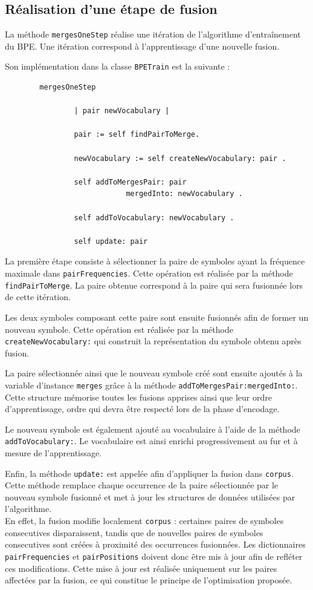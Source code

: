 \documentclass[12pt,a4paper]{report}
\begin{document}
	\subsection{Réalisation d’une étape de fusion}
	
	La méthode \texttt{mergesOneStep} réalise une itération de l’algorithme d’entraînement du BPE. Une itération correspond à l’apprentissage d’une nouvelle fusion.
	
	Son implémentation dans la classe \texttt{BPETrain} est la suivante :
	
	\begin{verbatim}
		mergesOneStep	
				
				| pair newVocabulary |
				
				pair := self findPairToMerge.	
				
				newVocabulary := self createNewVocabulary: pair .	
				
				self addToMergesPair: pair
							mergedInto: newVocabulary .	
				
				self addToVocabulary: newVocabulary .
				
				self update: pair
	\end{verbatim}
	
	La première étape consiste à sélectionner la paire de symboles ayant la fréquence maximale dans \texttt{pairFrequencies}. Cette opération est réalisée par la méthode \texttt{findPairToMerge}. La paire obtenue correspond à la paire qui sera fusionnée lors de cette itération.
	
	Les deux symboles composant cette paire sont ensuite fusionnés afin de former un nouveau symbole. Cette opération est réalisée par la méthode \texttt{createNewVocabulary:} qui construit la représentation du symbole obtenu après fusion.
	
	La paire sélectionnée ainsi que le nouveau symbole créé sont ensuite ajoutés à la variable d’instance \texttt{merges} grâce à la méthode \texttt{addToMergesPair:mergedInto:}. Cette structure mémorise toutes les fusions apprises ainsi que leur ordre d’apprentissage, ordre qui devra être respecté lors de la phase d’encodage.
	
	Le nouveau symbole est également ajouté au vocabulaire à l’aide de la méthode \texttt{addToVocabulary:}. Le vocabulaire est ainsi enrichi progressivement au fur et à mesure de l’apprentissage.
	
	Enfin, la méthode \texttt{update:} est appelée afin d’appliquer la fusion dans \texttt{corpus}. Cette méthode remplace chaque occurrence de la paire sélectionnée par le nouveau symbole fusionné et met à jour les structures de données utilisées par l’algorithme.\\
	En effet, la fusion modifie localement \texttt{corpus} : certaines paires de symboles consecutives disparaissent, tandis que de nouvelles paires de symboles consecutives sont créées à proximité des occurrences fusionnées. Les dictionnaires \texttt{pairFrequencies} et \texttt{pairPositions} doivent donc être mis à jour afin de refléter ces modifications. Cette mise à jour est réalisée uniquement sur les paires affectées par la fusion, ce qui constitue le principe de l’optimisation proposée.
	
\end{document}
